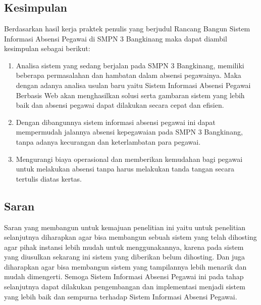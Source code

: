 %


%

\chapter{\babLima}
\section{Kesimpulan}
\par Berdasarkan hasil kerja praktek penulis yang berjudul Rancang Bangun Sistem Informasi Absensi Pegawai di SMPN 3 Bangkinang maka dapat diambil kesimpulan sebagai berikut:
\begin{enumerate}
\item Analisa sistem yang sedang berjalan pada SMPN 3 Bangkinang, memiliki beberapa permasalahan dan hambatan dalam absensi pegawainya. Maka dengan adanya analisa usulan baru yaitu Sistem Informasi Absensi Pegawai Berbasis Web akan menghasilkan solusi serta gambaran sistem yang lebih baik dan absensi pegawai dapat dilakukan secara cepat dan efisien.
\item Dengan dibangunnya sistem informasi absensi pegawai ini dapat mempermudah jalannya absensi kepegawaian pada SMPN 3 Bangkinang, tanpa adanya kecurangan dan keterlambatan para pegawai.
\item Mengurangi biaya operasional dan memberikan kemudahan bagi pegawai untuk melakukan absensi tanpa harus melakukan tanda tangan secara tertulis diatas kertas.
\end{enumerate}
\section{Saran}
\par Saran yang membangun untuk kemajuan penelitian ini yaitu untuk penelitian selanjutnya diharapkan agar bisa membangun sebuah sistem yang telah dihosting agar pihak instansi lebih mudah untuk menggunakannya, karena pada sistem yang diusulkan sekarang ini sistem yang diberikan belum dihosting. Dan juga diharapkan agar bisa membangun sistem yang tampilannya lebih menarik dan mudah dimengerti. Semoga Sistem Informasi Absensi Pegawai ini pada tahap selanjutnya dapat dilakukan pengembangan dan implementasi menjadi sistem yang lebih baik dan sempurna terhadap Sistem Informasi Absensi Pegawai.
